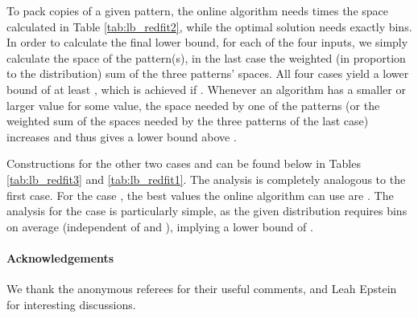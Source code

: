 To pack  copies of a given pattern, the online algorithm needs 
times the space calculated in Table \ref{tab:lb_redfit2}, while the optimal solution needs exactly  bins. 
In order to calculate the final lower bound, for each of the four inputs, we simply calculate the space of the pattern(s), in the last case the weighted (in proportion to the distribution) sum of the three patterns' spaces. All four cases yield a lower bound of at least {\finallb}, which is achieved if .
Whenever an algorithm has a smaller or larger value for some  value, the space needed by one of the patterns (or the weighted sum of the spaces needed by the three patterns of the last case) increases and thus gives a lower bound above \finallb{}.

Constructions for the other two cases  and  can be found below in Tables \ref{tab:lb_redfit3} and \ref{tab:lb_redfit1}.
The analysis is completely analogous to the first case.
For the case , the best values the online algorithm can use are .
The analysis for the case  is particularly simple, as the given distribution requires
 bins on average (independent of  and ), implying a lower bound of .

\begin{table}[h]
	\caption{Inputs for lower bound  in case .}
	\label{tab:lb_redfit1}
	\centering
\end{table}
\vspace{-20pt}
\begin{table}[h]
	\caption{Inputs for lower bound  in case .}
	\label{tab:lb_redfit3}
	\centering
\end{table}

\vspace{-30pt}
\paragraph{Acknowledgements}
	We thank the anonymous referees for their useful comments, and Leah Epstein
	for interesting discussions.












